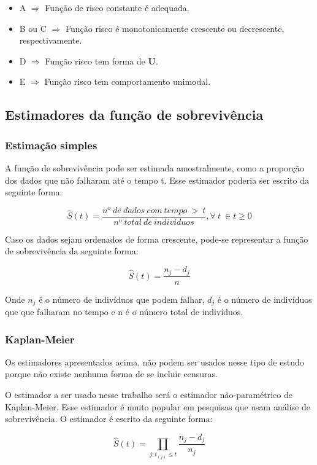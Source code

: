 \documentclass[a4paper,12pt]{article}
\begin{document}
\begin{itemize}
	\item A $\Rightarrow$ Função de risco constante é adequada.
	\item B ou C $\Rightarrow$ Função
risco é monotonicamente crescente ou decrescente, respectivamente.
	\item D $\Rightarrow$ Função risco tem forma de \textbf{U}.
	\item E $\Rightarrow$ Função risco tem comportamento unimodal.
\end{itemize}

\subsection{Estimadores da função de sobrevivência}

\subsubsection{Estimação simples}

A função de sobrevivência pode ser estimada amostralmente, como a proporção dos dados que não falharam até o tempo t. Esse estimador poderia ser escrito da seguinte forma:

$$ \hat{S}(t) = \dfrac{n^o \ de \ dados \ com \ tempo \ > \ t}{n^o \ total \ de \ individuos}, \forall \ t \ \in t\ge 0$$

Caso os dados sejam ordenados de forma crescente, pode-se representar a função de sobrevivência da seguinte forma:

$$ \hat{S}(t) = \dfrac{n_j - d_j}{n} $$

Onde $n_j$ é o número de indivíduos que podem falhar, $d_j$ é o número de indivíduos que que falharam no tempo e n é o número total de indivíduos.

\subsubsection{Kaplan-Meier}

Os estimadores apresentados acima, não podem ser usados nesse tipo de estudo porque não existe nenhuma forma de se incluir censuras.

O estimador a ser usado nesse trabalho será o estimador não-paramétrico de Kaplan-Meier. Esse estimador é muito popular em pesquisas que usam análise de sobrevivência. O estimador é escrito da seguinte forma:

$$ \hat{S}(t) = \prod_{j:t_{(j)}\le t} \dfrac{n_j - d_j}{n_j}$$
\end{document}
